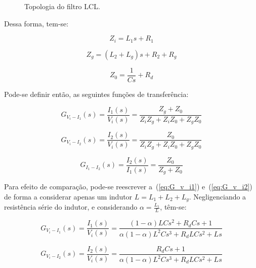     \begin{figure}[htb]
        \centering{
            \def\svgwidth{\textwidth}
            }
        \renewcommand\figurename{Fig.}
        \caption{Topologia do filtro LCL.}
        \label{fig:LCL_topologia}
    \end{figure}

    Dessa forma, tem-se:

    \begin{equation*}
        Z_i = L_1s +R_1
    \end{equation*}

    \begin{equation*}
        Z_g = (L_2 + L_g)s + R_2 + R_g
    \end{equation*}

    \begin{equation*}
        Z_0 = \frac{1}{Cs} + R_d
    \end{equation*}

    Pode-se definir então, as seguintes funções de transferência:

    \begin{equation}
        G_{V_i-I_1}(s) = \frac{I_1(s)}{V_i(s)} = \frac{Z_g + Z_0}{Z_iZ_g + Z_iZ_0 + Z_gZ_0}
        \label{eq:G_v_i1}
    \end{equation}

    \begin{equation}
        G_{V_i-I_2}(s) = \frac{I_2(s)}{V_i(s)} = \frac{Z_0}{Z_iZ_g + Z_iZ_0 + Z_gZ_0}
        \label{eq:G_v_i2}
    \end{equation}

    \begin{equation}
        G_{I_1-I_2}(s) = \frac{I_2(s)}{I_1(s)} = \frac{Z_0}{Z_g + Z_0}
        \label{eq:G_i1_i2}
    \end{equation}

    Para efeito de comparação, pode-se reescrever a~(\ref{eq:G_v_i1})
    e~(\ref{eq:G_v_i2}) de forma a considerar apenas um indutor
    $L = L_1 + L_2 + L_g$. Negligenciando a resistência série do indutor,
    e considerando $\alpha = \frac{L_1}{L}$, têm-se:

    \begin{equation}
        G_{V_i-I_1}(s) = \frac{I_1(s)}{V_i(s)} = \frac{(1-\alpha)LCs^2+R_dCs+1}{\alpha(1-\alpha)L^2Cs^3+R_dLCs^2+Ls}
    \end{equation}

    \begin{equation}
        G_{V_i-I_2}(s) = \frac{I_2(s)}{V_i(s)} = \frac{R_dCs+1}{\alpha(1-\alpha)L^2Cs^3+R_dLCs^2+Ls}
        \label{eq:G_v_i2_2}
    \end{equation}

